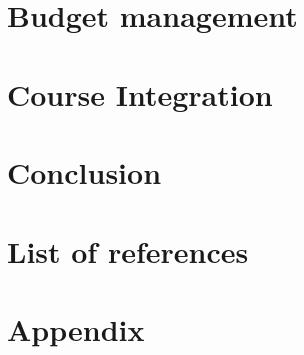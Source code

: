 \documentclass[11pt]{article}
\begin{document}
\paragraph{}\mbox{}\\

\section{Budget management}

\section{Course Integration}

\section{Conclusion}

\section{List of references}

\section{Appendix}
\end{document}

